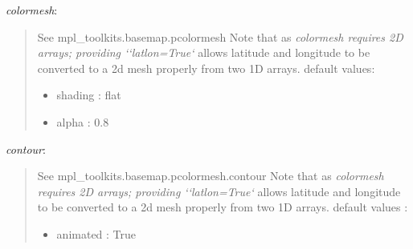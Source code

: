 \documentclass[letterpaper,10pt,english]{sphinxhowto}
\begin{document}
\begin{fulllineitems}
\emph{colormesh}:
\begin{quote}

See mpl\_toolkits.basemap.pcolormesh
Note that as \emph{colormesh requires 2D arrays; providing
{}`{}`latlon=True{}`} allows latitude and longitude to be converted to a
2d mesh properly from two 1D arrays.
default values:
\begin{itemize}
\item {} 
shading : flat

\item {} 
alpha : 0.8

\end{itemize}
\end{quote}

\emph{contour}:
\begin{quote}

See mpl\_toolkits.basemap.pcolormesh.contour
Note that as \emph{colormesh requires 2D arrays; providing
{}`{}`latlon=True{}`} allows latitude and longitude to be converted to a
2d mesh properly from two 1D arrays.
default values :
\begin{itemize}
\item {} 
animated : True

\end{itemize}
\end{quote}

\end{fulllineitems}

\end{document}
